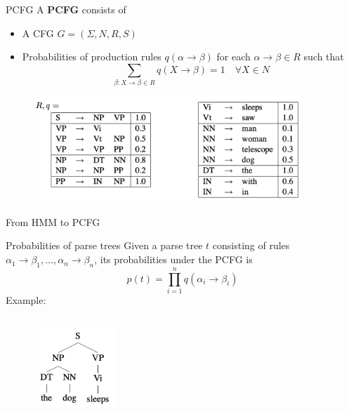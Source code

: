 \documentclass[usenames,dvipsnames,notes]{beamer}
\begin{document}
\begin{frame}
    {PCFG}
    A \textbf{PCFG} consists of\\
    \begin{itemize}
        \item A CFG $G=(\Sigma, N, R, S)$
        \item Probabilities of production rules $q(\alpha\rightarrow\beta)$ for each $\alpha\rightarrow\beta\in R$ such that
            $$
            \sum_{\beta\colon X\rightarrow\beta\in R}q(X\rightarrow\beta) = 1
            \quad \forall X\in N
            $$
    \end{itemize}
    \vspace{-1em}
    \begin{figure}    
        \includegraphics[height=4cm]{figures/toy-pcfg.png}
    \end{figure}  
\end{frame}

\begin{frame}
    {From HMM to PCFG}
\end{frame}

\begin{frame}
    {Probabilities of parse trees}
    Given a parse tree $t$ consisting of rules
    $\alpha_1\rightarrow\beta_1,\ldots, \alpha_n\rightarrow\beta_n$,
    its probabilities under the PCFG is
    $$
    p(t) = \prod_{i=1}^n q(\alpha_i\rightarrow\beta_i)
    $$
    \vspace{-1em}
    Example:

    \begin{columns}
        \begin{column}{0.5\textwidth}
    \begin{figure}    
        \includegraphics[height=3cm]{figures/toy-tree.png}
    \end{figure}  
        \end{column}
        \begin{column}{0.5\textwidth}
        \end{column}
    \end{columns}
\end{frame}
\end{document}
